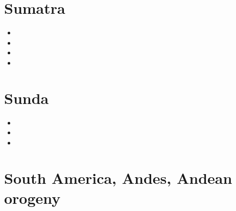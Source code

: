\section{Sumatra}

\begin{small}
\begin{itemize}
\item[2013] 
\item[2015] 
\item[2025] 
\item[2026] 
\end{itemize}
\end{small}





\section{Sunda}

\begin{small}
\begin{itemize}
\item[\twothousandeighteen]
\item[\twothousandtwentytwo]
\item[\twothousandtwentyfive]
\end{itemize}
\end{small}

\section{South America, Andes, Andean orogeny}

